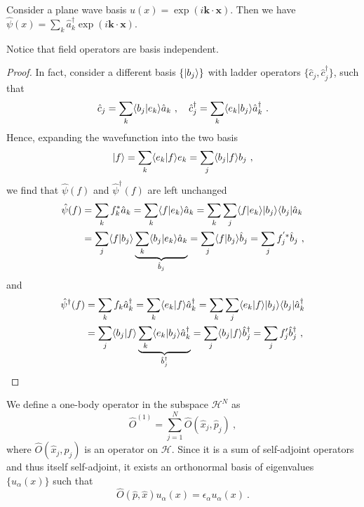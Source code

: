     \begin{example}
        Consider a plane wave basis $u(x) = \exp (i \mathbf k \cdot \mathbf x) $. Then we have $\hat \psi(x) = \sum_k \hat a_k^\dagger \exp(i \mathbf k \cdot \mathbf x)$.
    \end{example}

    Notice that field operators are basis independent.
    \begin{proof}
        In fact, consider a different basis $\{\vert b_j\rangle\}$ with ladder operators $\{ \hat c_j, \hat c_j^\dagger\}$, such that 
        \begin{equation*}
            \hat c_j = \sum_k \langle b_j\vert e_k\rangle \hat a_k ~, \quad \hat c_j^\dagger = \sum_k \langle e_k\vert b_j\rangle \hat a_k^\dagger ~.
        \end{equation*}
        Hence, expanding the wavefunction into the two basis 
        \begin{equation*}
            \vert f\rangle = \sum_k \langle e_k\vert f\rangle e_k = \sum_j \langle b_j\vert f\rangle b_j ~,
        \end{equation*}
        we find that $\hat \psi(f)$ and $\hat \psi^\dagger (f)$ are left unchanged 
        \begin{equation*}
        \begin{aligned}
            \hat \psi(f) & = \sum_k f_k^* \hat a_k = \sum_k \langle f\vert e_k\rangle \hat a_k = \sum_k \sum_j \langle f\vert e_k\rangle \vert b_j\rangle \langle b_j\vert \hat a_k \\ & = \sum_j \langle f\vert b_j\rangle \underbrace{\sum_k \langle b_j\vert e_k\rangle \hat a_k}_{\hat b_j} = \sum_j \langle f\vert b_j\rangle \hat b_j = \sum_j f^{'*}_j  \hat b_j  ~,
        \end{aligned}
        \end{equation*}
        and 
        \begin{equation*}
        \begin{aligned}
            \hat \psi^\dagger (f) & = \sum_k f_k \hat a_k^\dagger = \sum_k \langle e_k\vert f\rangle \hat a_k^\dagger = \sum_k \sum_j \langle e_k\vert f\rangle \vert b_j\rangle \langle b_j\vert \hat a_k^\dagger \\ & = \sum_j \langle b_j\vert f\rangle \underbrace{\sum_k \langle e_k\vert b_j\rangle \hat a_k^\dagger}_{\hat b_j^\dagger} = \sum_j \langle b_j\vert f\rangle \hat b_j^\dagger = \sum_j f'_j  \hat b_j^\dagger  ~,
        \end{aligned}
        \end{equation*}
    \end{proof}

    We define a one-body operator in the subspace $\mathcal H^{N}$ as 
    \begin{equation*}
        \hat O^{(1)} = \sum_{j=1}^{N} \hat O(\hat x_j, \hat p_j) ~,
    \end{equation*}
    where $\hat O(\hat x_j, \hat p_j)$ is an operator on $\mathcal H$. Since it is a sum of self-adjoint operators and thus itself self-adjoint, it exists an orthonormal basis of eigenvalues $\{u_\alpha (x)\}$ such that 
    \begin{equation}\label{evop}
        \hat O(\hat p, \hat x) u_\alpha (x) = \epsilon_\alpha u_\alpha (x) ~.
    \end{equation}

